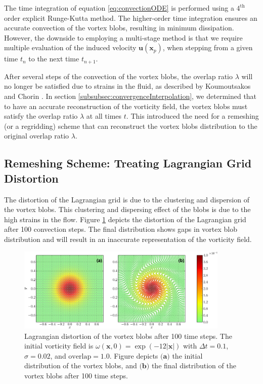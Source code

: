 The time integration of equation \ref{eq:convectionODE} is performed using a $4^{\mathrm{th}}$ order explicit Runge-Kutta method. The higher-order time integration ensures an accurate convection of the vortex blobs, resulting in minimum dissipation. However, the downside to employing a multi-stage method is that we require multiple evaluation of the induced velocity $\mathbf{u}\left(\mathbf{x}_p\right)$, when stepping from a given time $t_n$ to the next time $t_{n+1}$.

After several steps of the convection of the vortex blobs, the overlap ratio $\lambda$ will no longer be satisfied due to strains in the fluid, as described by Koumoutsakos and Chorin \cite{Cottet2000a}. In section \ref{subsubsec:convergenceInterpolation}, we determined that to have an accurate reconstruction of the vorticity field, the vortex blobs must satisfy the overlap ratio $\lambda$ at all times $t$. This introduced the need for a remeshing (or a regridding) scheme that can reconstruct the vortex blobs distribution to the original overlap ratio $\lambda$.

\subsection{Remeshing Scheme: Treating Lagrangian Grid Distortion}
\label{subsec:remeshing}

The distortion of the Lagrangian grid is due to the clustering and dispersion of the vortex blobs. This clustering and dispersing effect of the blobs is due to the high strains in the flow. Figure \ref{fig:distortion} depicts the distortion of the Lagrangian grid after 100 convection steps. The final distribution shows gaps in vortex blob distribution and will result in an inaccurate representation of the vorticity field. 

	\begin{figure}[!h]
	\centering
	\includegraphics[width=0.9\textwidth]{figures/lagrangian/distortion-crop.pdf}
    \caption{Lagrangian distortion of the vortex blobs after 100 time steps. The initial vorticity field is $\omega\left(\mathbf{x},0\right) = \exp\left(-12\left|\mathbf{x}\right|\right)$ with $\Delta t = 0.1$, $\sigma=0.02$, and $\mathrm{overlap} = 1.0$. Figure depicts $\textbf{(a)}$ the initial distribution of the vortex blobs, and $\textbf{(b)}$ the final distribution of the vortex blobs after 100 time steps.}
    \label{fig:distortion}
	\end{figure}

